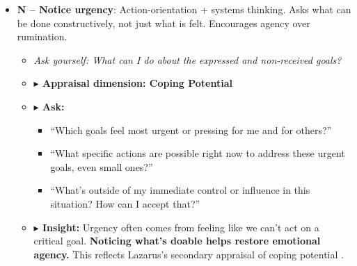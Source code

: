 \documentclass{article}
\begin{document}
\begin{itemize}[noitemsep,topsep=0pt]
    \item \textbf{N – Notice urgency}: Action-orientation + systems thinking. Asks what can be done constructively, not just what is felt. Encourages agency over rumination.
    \begin{itemize}[noitemsep,topsep=0pt]
        \item \textit{Ask yourself: What can I do about the expressed and non-received goals?}
        \item \textbf{$\blacktriangleright$ Appraisal dimension: Coping Potential}
        \item \textbf{$\blacktriangleright$ Ask:}
        \begin{itemize}[noitemsep,topsep=0pt]
            \item “Which goals feel most urgent or pressing for me and for others?”
            \item “What specific actions are possible right now to address these urgent goals, even small ones?”
            \item “What’s outside of my immediate control or influence in this situation? How can I accept that?”
        \end{itemize}
        \item \textbf{$\blacktriangleright$ Insight:} Urgency often comes from feeling like we can't act on a critical goal. \textbf{Noticing what’s doable helps restore emotional agency.} This reflects Lazarus's secondary appraisal of coping potential \cite{lazarus1984stress}.
    \end{itemize}


\end{itemize}
\end{document}
